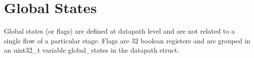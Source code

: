 
\chapter{Global States}
\label{chap:global_states}
Global states (or flags) are defined at datapath level and are not related to a single flow of a particular stage.
Flags are 32 boolean registers and are grouped in an uint32\_t variable global\_states in the datapath struct.

